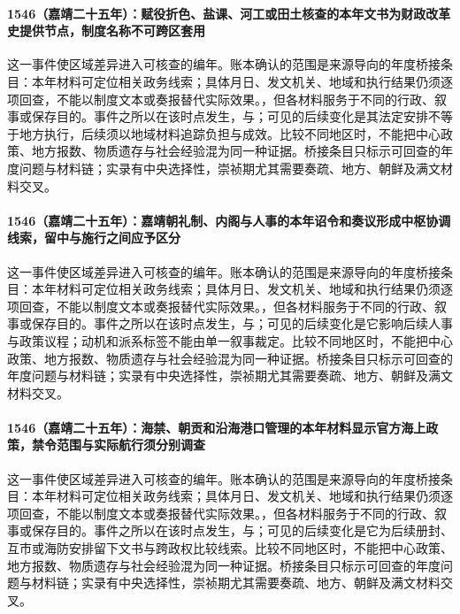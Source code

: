 \paragraph{1546（嘉靖二十五年）：赋役折色、盐课、河工或田土核查的本年文书为财政改革史提供节点，制度名称不可跨区套用} 这一事件使区域差异进入可核查的编年。账本确认的范围是来源导向的年度桥接条目：本年材料可定位相关政务线索；具体月日、发文机关、地域和执行结果仍须逐项回查，不能以制度文本或奏报替代实际效果。，但各材料服务于不同的行政、叙事或保存目的。事件之所以在该时点发生，与；可见的后续变化是其法定安排不等于地方执行，后续须以地域材料追踪负担与成效。比较不同地区时，不能把中心政策、地方报数、物质遗存与社会经验混为同一种证据。桥接条目只标示可回查的年度问题与材料链；实录有中央选择性，崇祯期尤其需要奏疏、地方、朝鲜及满文材料交叉。

\paragraph{1546（嘉靖二十五年）：嘉靖朝礼制、内阁与人事的本年诏令和奏议形成中枢协调线索，留中与施行之间应予区分} 这一事件使区域差异进入可核查的编年。账本确认的范围是来源导向的年度桥接条目：本年材料可定位相关政务线索；具体月日、发文机关、地域和执行结果仍须逐项回查，不能以制度文本或奏报替代实际效果。，但各材料服务于不同的行政、叙事或保存目的。事件之所以在该时点发生，与；可见的后续变化是它影响后续人事与政策议程；动机和派系标签不能由单一叙事裁定。比较不同地区时，不能把中心政策、地方报数、物质遗存与社会经验混为同一种证据。桥接条目只标示可回查的年度问题与材料链；实录有中央选择性，崇祯期尤其需要奏疏、地方、朝鲜及满文材料交叉。

\paragraph{1546（嘉靖二十五年）：海禁、朝贡和沿海港口管理的本年材料显示官方海上政策，禁令范围与实际航行须分别调查} 这一事件使区域差异进入可核查的编年。账本确认的范围是来源导向的年度桥接条目：本年材料可定位相关政务线索；具体月日、发文机关、地域和执行结果仍须逐项回查，不能以制度文本或奏报替代实际效果。，但各材料服务于不同的行政、叙事或保存目的。事件之所以在该时点发生，与；可见的后续变化是它为后续册封、互市或海防安排留下文书与跨政权比较线索。比较不同地区时，不能把中心政策、地方报数、物质遗存与社会经验混为同一种证据。桥接条目只标示可回查的年度问题与材料链；实录有中央选择性，崇祯期尤其需要奏疏、地方、朝鲜及满文材料交叉。

